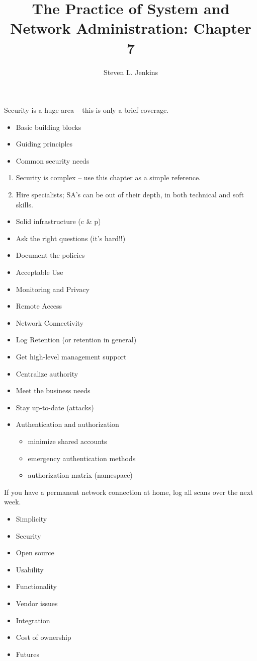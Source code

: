 \documentclass{slides}
\title{The Practice of System and Network Administration: Chapter 7}
\author{Steven L. Jenkins}
\newcommand{\bi}{\begin{itemize}}
\newcommand{\ei}{\end{itemize}}
\newcommand{\be}{\begin{enumerate}}
\newcommand{\ee}{\end{enumerate}}
\begin{document}

Security is a huge area -- this is only a brief coverage.  

\bi
\item Basic building blocks
\item Guiding principles
\item Common security needs
\ei

\be
\item Security is complex -- use this chapter as a simple reference.
\item Hire specialists; SA's can be out of their depth, in both 
technical and soft skills.
\ee

\bi
\item Solid infrastructure (c \& p)
\item Ask the right questions (it's hard!!)
\item Document the policies
\ei


\bi
\item Acceptable Use
\item Monitoring and Privacy
\item Remote Access
\item Network Connectivity
\item Log Retention (or retention in general)
\ei

\bi
\item Get high-level management support
\item Centralize authority
\ei

\bi
\item Meet the business needs
\item Stay up-to-date (attacks)
\item Authentication and authorization
	\bi
	\item minimize shared accounts
	\item emergency authentication methods
	\item authorization matrix (namespace)
	\ei
\ei


If you have a permanent network connection at home, log all
scans over the next week.

\bi
\item Simplicity
\item Security
\item Open source
\item Usability
\item Functionality
\item Vendor issues
\item Integration
\item Cost of ownership
\item Futures
\ei
\end{document}
